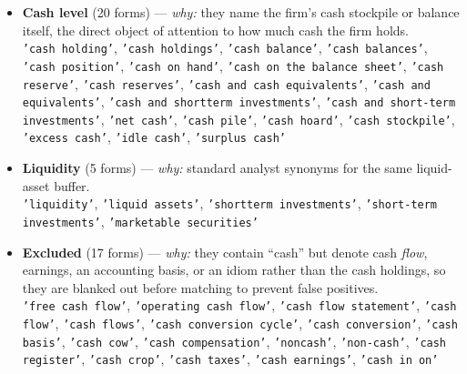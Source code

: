 \begin{itemize}\setlength\itemsep{3pt}
\item \textbf{Cash level} (20 forms) --- \emph{why:} they name the firm's cash stockpile or balance itself, the direct object of attention to how much cash the firm holds. \\ \texttt{'cash holding'}, \texttt{'cash holdings'}, \texttt{'cash balance'}, \texttt{'cash balances'}, \texttt{'cash position'}, \texttt{'cash on hand'}, \texttt{'cash on the balance sheet'}, \texttt{'cash reserve'}, \texttt{'cash reserves'}, \texttt{'cash and cash equivalents'}, \texttt{'cash and equivalents'}, \texttt{'cash and shortterm investments'}, \texttt{'cash and short-term investments'}, \texttt{'net cash'}, \texttt{'cash pile'}, \texttt{'cash hoard'}, \texttt{'cash stockpile'}, \texttt{'excess cash'}, \texttt{'idle cash'}, \texttt{'surplus cash'}
\item \textbf{Liquidity} (5 forms) --- \emph{why:} standard analyst synonyms for the same liquid-asset buffer. \\ \texttt{'liquidity'}, \texttt{'liquid assets'}, \texttt{'shortterm investments'}, \texttt{'short-term investments'}, \texttt{'marketable securities'}
\item \textbf{Excluded} (17 forms) --- \emph{why:} they contain ``cash'' but denote cash \emph{flow}, earnings, an accounting basis, or an idiom rather than the cash holdings, so they are blanked out before matching to prevent false positives. \\ \texttt{'free cash flow'}, \texttt{'operating cash flow'}, \texttt{'cash flow statement'}, \texttt{'cash flow'}, \texttt{'cash flows'}, \texttt{'cash conversion cycle'}, \texttt{'cash conversion'}, \texttt{'cash basis'}, \texttt{'cash cow'}, \texttt{'cash compensation'}, \texttt{'noncash'}, \texttt{'non-cash'}, \texttt{'cash register'}, \texttt{'cash crop'}, \texttt{'cash taxes'}, \texttt{'cash earnings'}, \texttt{'cash in on'}
\end{itemize}
